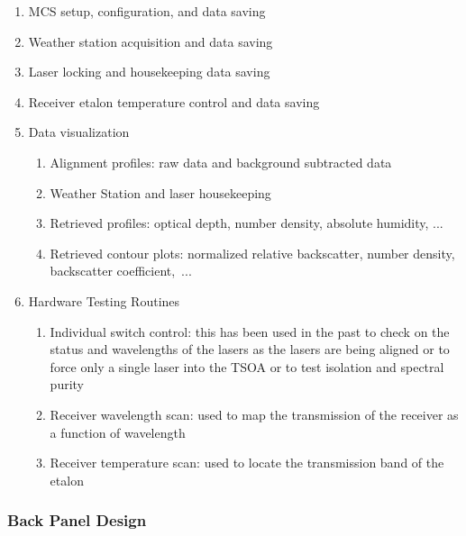 \begin{enumerate}
	\item{MCS setup, configuration, and data saving}
	\item{Weather station acquisition and data saving}
	\item{Laser locking and housekeeping data saving}
	\item{Receiver etalon temperature control and data saving}
	\item{Data visualization}
		\begin{enumerate}
			\item{Alignment profiles: raw data and background subtracted data}
			\item{Weather Station and laser housekeeping}
			\item{Retrieved profiles: optical depth, number density, absolute humidity, ... }
			\item{Retrieved contour plots: normalized relative backscatter, number density, backscatter coefficient,~...}
		\end{enumerate}
	\item{Hardware Testing Routines}
		\begin{enumerate}
			\item{Individual switch control: this has been used in the past to check on the status and wavelengths of the lasers as the lasers are being aligned or to force only a single laser into the TSOA or to test isolation and spectral purity}
			\item{Receiver wavelength scan: used to map the transmission of the receiver as a function of wavelength}
			\item{Receiver temperature scan: used to locate the transmission band of the etalon}
		\end{enumerate}
\end{enumerate}

\subsubsection{Back Panel Design}\label{Sec:BPDesign}

